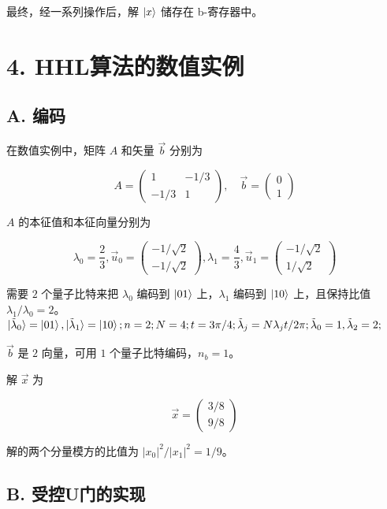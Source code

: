 \documentclass[aps,prl,twocolumn,groupedaddress]{revtex4-2}
\begin{document}
最终，经一系列操作后，解 $\ket{x}$ 储存在 b-寄存器中。

\section{4. HHL算法的数值实例}

\subsection{A. 编码}

在数值实例中，矩阵 $A$ 和矢量 $\vec{b}$ 分别为

$$
A
=\begin{pmatrix}
1 &-1/3 \\
-1/3 &1  
\end{pmatrix},\quad
\vec{b}
=\begin{pmatrix}
0 \\
1
\end{pmatrix}
$$

$A$ 的本征值和本征向量分别为

$$
\lambda_0 = \frac{2 }{3 } ,
\vec{u}_0
=\begin{pmatrix}
-1/\sqrt{2} \\
-1/\sqrt{2}
\end{pmatrix},
\lambda_1 = \frac{4 }{3 } ,
\vec{u}_1
=\begin{pmatrix}
-1/\sqrt{2} \\
1/\sqrt{2}
\end{pmatrix}
$$

需要 $2$ 个量子比特来把 $\lambda_0$ 编码到 $\ket{01}$ 上，$\lambda_1$ 编码到 $\ket{10}$ 上，且保持比值 $\lambda_1/\lambda_0=2$。$\ket{\tilde{\lambda}_0}=\ket{01},\ket{\tilde{\lambda}_1}=\ket{10};n=2;N=4;t=3\pi/4;\tilde{\lambda}_j=N\lambda_j t/2\pi;\tilde{\lambda}_0=1,\tilde{\lambda}_2=2;$

$\vec{b}$ 是 $2$ 向量，可用 $1$ 个量子比特编码，$n_b=1$。

解 $\vec{x} $ 为

$$
\vec{x}
=\begin{pmatrix}
3/8 \\
9/8
\end{pmatrix}
$$

解的两个分量模方的比值为 $\left|x_0 \right|^2/\left|x_1 \right|^2=1/9$。

\subsection{B. 受控U门的实现}
\end{document}
